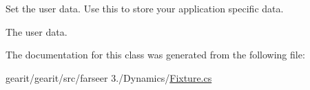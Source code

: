 Set the user data. Use this to store your application specific data. 

The user data.

The documentation for this class was generated from the following file\+:\begin{DoxyCompactItemize}
\item 
gearit/gearit/src/farseer 3./\+Dynamics/\hyperlink{_fixture_8cs}{Fixture.\+cs}\end{DoxyCompactItemize}
